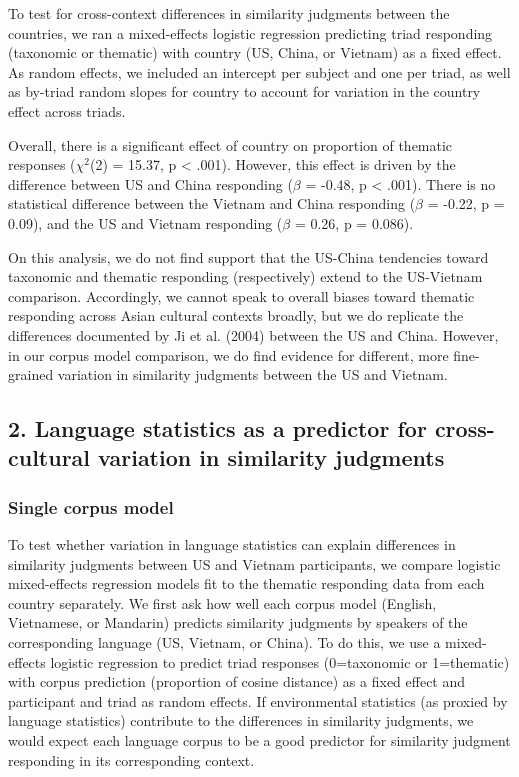 \documentclass[10pt, letterpaper]{article}
\begin{document}
To test for cross-context differences in similarity judgments between
the countries, we ran a mixed-effects logistic regression predicting
triad responding (taxonomic or thematic) with country (US, China, or
Vietnam) as a fixed effect. As random effects, we included an intercept
per subject and one per triad, as well as by-triad random slopes for
country to account for variation in the country effect across triads.

Overall, there is a significant effect of country on proportion of
thematic responses (\(\chi^2\)(2) = 15.37, p \textless{} .001). However,
this effect is driven by the difference between US and China responding
(\(\beta\) = -0.48, p \textless{} .001). There is no statistical
difference between the Vietnam and China responding (\(\beta\) = -0.22,
p = 0.09), and the US and Vietnam responding (\(\beta\) = 0.26, p =
0.086).

On this analysis, we do not find support that the US-China tendencies
toward taxonomic and thematic responding (respectively) extend to the
US-Vietnam comparison. Accordingly, we cannot speak to overall biases
toward thematic responding across Asian cultural contexts broadly, but
we do replicate the differences documented by Ji et al. (2004) between
the US and China. However, in our corpus model comparison, we do find
evidence for different, more fine-grained variation in similarity
judgments between the US and Vietnam.

\hypertarget{language-statistics-as-a-predictor-for-cross-cultural-variation-in-similarity-judgments}{%
\subsection{2. Language statistics as a predictor for cross-cultural
variation in similarity
judgments}\label{language-statistics-as-a-predictor-for-cross-cultural-variation-in-similarity-judgments}}

\hypertarget{single-corpus-model}{%
\subsubsection{Single corpus model}\label{single-corpus-model}}

To test whether variation in language statistics can explain differences
in similarity judgments between US and Vietnam participants, we compare
logistic mixed-effects regression models fit to the thematic responding
data from each country separately. We first ask how well each corpus
model (English, Vietnamese, or Mandarin) predicts similarity judgments
by speakers of the corresponding language (US, Vietnam, or China). To do
this, we use a mixed-effects logistic regression to predict triad
responses (0=taxonomic or 1=thematic) with corpus prediction (proportion
of cosine distance) as a fixed effect and participant and triad as
random effects. If environmental statistics (as proxied by language
statistics) contribute to the differences in similarity judgments, we
would expect each language corpus to be a good predictor for similarity
judgment responding in its corresponding context.
\end{document}
